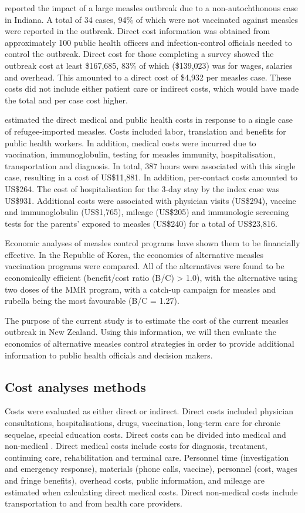\documentclass{article}
\begin{document}
{\citep{parker6} reported the impact of a large measles outbreak due to a non-autochthonous case in Indiana. A total of 34 cases, 94\% of which were not vaccinated against measles were reported in the outbreak. Direct cost information was obtained from approximately 100 public health officers and infection-control officials needed to control the outbreak. Direct cost for those completing a survey showed the outbreak cost at least \$167,685, 83\% of which (\$139,023) was for wages, salaries and overhead. This amounted to a direct cost of \$4,932 per measles case. These costs did not include either patient care or indirect costs, which would have made the total and per case cost higher.

\citep{coleman12} estimated the direct medical and public health costs in response to a single case of refugee-imported measles.  Costs included labor, translation and benefits for public health workers. In addition, medical costs were incurred due to vaccination, immunoglobulin, testing for measles immunity, hospitalisation, transportation and diagnosis. In total, 387 hours were associated with this single case, resulting in a cost of US\$11,881. In addition, per-contact costs amounted to US\$264. The cost of hospitalisation for the 3-day stay by the index case was US\$931. Additional costs were associated with physician visits (US\$294), vaccine and immunoglobulin (US\$1,765), mileage (US\$205) and immunologic screening tests for the parents' exposed to measles (US\$240) for a total of US\$23,816.

Economic analyses of measles control programs have shown them to be financially effective. In the Republic of Korea, the economics of alternative measles vaccination programs were compared. All of the alternatives were found to be economically efficient (benefit/cost ratio (B/C) > 1.0), with the alternative using two doses of the MMR program, with a catch-up campaign for measles and rubella being the most favourable (B/C = 1.27).

The purpose of the current study is to estimate the cost of the current measles outbreak in New Zealand. Using this information, we will then evaluate the economics of alternative measles control strategies in order to provide additional information to public health officials and decision makers.

\subsection{Cost analyses methods}
Costs were evaluated as either direct or indirect. Direct costs included physician consultations, hospitalisations, drugs, vaccination, long-term care for chronic sequelae, special education costs. Direct costs can be divided into medical and non-medical \citep{saha13}. Direct medical costs include costs for diagnosis, treatment, continuing care, rehabilitation and terminal care. Personnel time (investigation and emergency response), materials (phone calls, vaccine), personnel (cost, wages and fringe benefits), overhead costs, public information, and mileage are estimated when calculating direct medical costs. Direct non-medical costs include transportation to and from health care providers.

}
\end{document}
